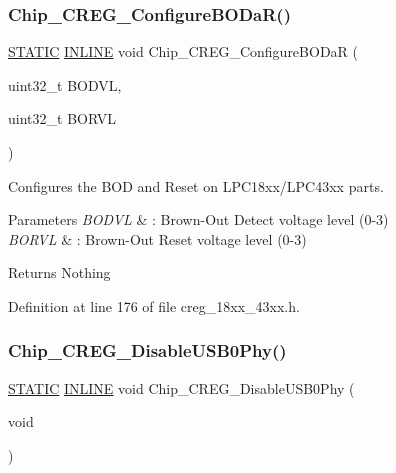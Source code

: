 \subsubsection{\texorpdfstring{Chip\+\_\+\+C\+R\+E\+G\+\_\+\+Configure\+B\+O\+Da\+R()}{Chip\_CREG\_ConfigureBODaR()}}
{\footnotesize\ttfamily \hyperlink{group___l_p_c___types___public___macros_ga10b2d890d871e1489bb02b7e70d9bdfb}{S\+T\+A\+T\+IC} \hyperlink{spifi__18xx__43xx_8h_a2eb6f9e0395b47b8d5e3eeae4fe0c116}{I\+N\+L\+I\+NE} void Chip\+\_\+\+C\+R\+E\+G\+\_\+\+Configure\+B\+O\+DaR (\begin{DoxyParamCaption}\item[{uint32\+\_\+t}]{B\+O\+D\+VL,  }\item[{uint32\+\_\+t}]{B\+O\+R\+VL }\end{DoxyParamCaption})}



Configures the B\+OD and Reset on L\+P\+C18xx/\+L\+P\+C43xx parts. 


\begin{DoxyParams}{Parameters}
{\em B\+O\+D\+VL} & \+: Brown-\/\+Out Detect voltage level (0-\/3) \\
\hline
{\em B\+O\+R\+VL} & \+: Brown-\/\+Out Reset voltage level (0-\/3) \\
\hline
\end{DoxyParams}
\begin{DoxyReturn}{Returns}
Nothing 
\end{DoxyReturn}


Definition at line 176 of file creg\+\_\+18xx\+\_\+43xx.\+h.

\mbox{\label{group___c_r_e_g__18_x_x__43_x_x_ga604f1e681ee7fcd16b9fe57c12e3e135}} 
\subsubsection{\texorpdfstring{Chip\+\_\+\+C\+R\+E\+G\+\_\+\+Disable\+U\+S\+B0\+Phy()}{Chip\_CREG\_DisableUSB0Phy()}}
{\footnotesize\ttfamily \hyperlink{group___l_p_c___types___public___macros_ga10b2d890d871e1489bb02b7e70d9bdfb}{S\+T\+A\+T\+IC} \hyperlink{spifi__18xx__43xx_8h_a2eb6f9e0395b47b8d5e3eeae4fe0c116}{I\+N\+L\+I\+NE} void Chip\+\_\+\+C\+R\+E\+G\+\_\+\+Disable\+U\+S\+B0\+Phy (\begin{DoxyParamCaption}\item[{void}]{ }\end{DoxyParamCaption})}




